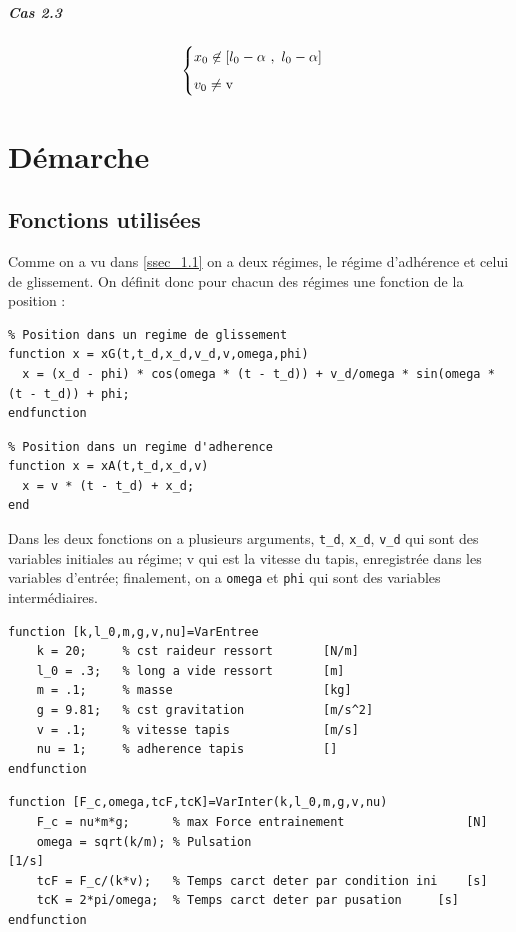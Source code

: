 \documentclass{article}
\begin{document}
\subparagraph{Cas 2.3}
$$
\begin{cases}
	\vspace{.2cm}
	x_0  \not\in [l_0-\alpha~,~l_0-\alpha]\\
	v_0 \neq \text{v}
\end{cases}
$$
\newpage
\section{Démarche}\label{sec_2}
\subsection{Fonctions utilisées}\label{ssec_2.1}
Comme on a vu dans \ref{ssec_1.1} on a deux régimes, le régime d'adhérence et celui de glissement. On définit donc pour chacun des régimes une fonction de la position : 

\begin{lstlisting}
% Position dans un regime de glissement
function x = xG(t,t_d,x_d,v_d,v,omega,phi)
  x = (x_d - phi) * cos(omega * (t - t_d)) + v_d/omega * sin(omega * (t - t_d)) + phi;
endfunction
\end{lstlisting}

\begin{lstlisting}
% Position dans un regime d'adherence
function x = xA(t,t_d,x_d,v)
  x = v * (t - t_d) + x_d;
end
\end{lstlisting}

Dans les deux fonctions on a plusieurs arguments, \verb|t_d|, \verb|x_d|, \verb|v_d| qui sont des variables initiales au régime; v qui est la vitesse du tapis, enregistrée dans les variables d'entrée; finalement, on a \verb|omega| et \verb|phi| qui sont des variables intermédiaires. \\
\begin{lstlisting}
function [k,l_0,m,g,v,nu]=VarEntree
	k = 20;		% cst raideur ressort    	[N/m]
	l_0 = .3;	% long a vide ressort    	[m]
	m = .1;		% masse                  	[kg]
	g = 9.81;	% cst gravitation        	[m/s^2]
	v = .1;		% vitesse tapis          	[m/s]
	nu = 1;		% adherence tapis        	[]
endfunction
\end{lstlisting}

\begin{lstlisting}
function [F_c,omega,tcF,tcK]=VarInter(k,l_0,m,g,v,nu)
	F_c = nu*m*g;      % max Force entrainement					[N]
	omega = sqrt(k/m); % Pulsation									[1/s]
	tcF = F_c/(k*v);   % Temps carct deter par condition ini	[s]
	tcK = 2*pi/omega;  % Temps carct deter par pusation		[s]
endfunction
\end{lstlisting}
\end{document}
